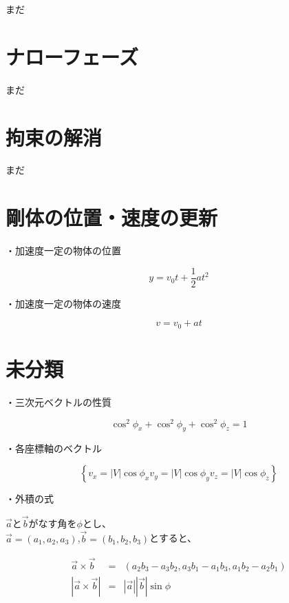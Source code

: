 \documentclass[11pt,aj4]{jarticle}
\begin{document}
まだ

\section{ナローフェーズ}

まだ

\section{拘束の解消}

まだ

\section{剛体の位置・速度の更新}

・加速度一定の物体の位置

\[
    y
    = v_0 t + \frac{1}{2} a t^2
\]

・加速度一定の物体の速度

\[
    v
    = v_0 + a t
\]

\section{未分類}

    ・三次元ベクトルの性質

    \[
        \cos^2\phi_x + \cos^2\phi_y + \cos^2\phi_z = 1
    \]

    ・各座標軸のベクトル

    \[
        \left\{
        v_x = |V| \cos\phi_x
        v_y = |V| \cos\phi_y
        v_z = |V| \cos\phi_z
        \right\}
    \]

    ・外積の式

    $\vec{a}$と$\vec{b}$がなす角を$\phi$とし、\\
    $\vec{a} = (a_1, a_2, a_3)$,$\vec{b} = (b_1, b_2, b_3)$とすると、

    \[
        \begin{split}
        \vec{a} \times \vec{b}
        &=& (a_2 b_3 - a_3 b_2, a_3 b_1 - a_1 b_3, a_1 b_2 - a_2 b_1) \\

        |\vec{a} \times \vec{b}|
        &=& |\vec{a}||\vec{b}| \sin \phi
            \end{split}
    \]
\end{document}
